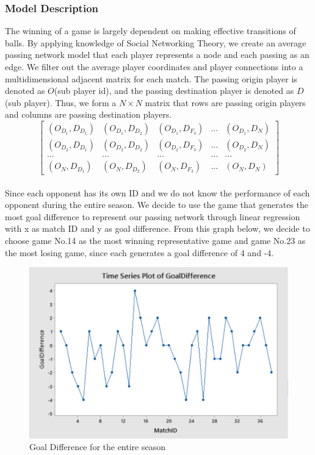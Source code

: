 \documentclass[12pt]{article}
\begin{document}
\subsubsection{Model Description}
The winning of a game is largely dependent on making effective transitions of balls. By applying knowledge of Social Networking Theory, we create an average passing network model that each player represents a node and each passing as an edge. We filter out the average player coordinates and player connections into a multidimensional adjacent matrix for each match. The passing origin player is denoted as $O$(sub player id), and the passing destination player is denoted as $D$(sub player). Thus, we form a $N \times N$ matrix that rows are passing origin players and columns are passing destination players. \\
\begin{equation*}
\begin{bmatrix}
(O_{D_1},D_{D_1}) & (O_{D_1},D_{D_2}) & (O_{D_1},D_{F_3}) &
...&
(O_{D_1},D_{N})\\
(O_{D_2},D_{D_1}) & (O_{D_2},D_{D_2}) & (O_{D_2},D_{F_3}) &
...&
(O_{D_2},D_{N})\\
... & ... & ...& ...& ...\\
(O_{N},D_{D_1}) & (O_{N},D_{D_2}) & (O_{N},D_{F_3}) &
...&
(O_{N},D_{N})
\end{bmatrix}
\end{equation*}\\
Since each opponent has its own ID and we do not know the performance of each opponent during the entire season. We decide to use the game that generates the most goal difference to represent our passing network through linear regression with x as match ID and y as goal difference. From this graph below, we decide to choose game No.14 as the most winning representative game and game No.23 as the most losing game, since each generates a goal difference of 4 and -4.\\
\begin{figure}[ht]
\begin{center}
\includegraphics[scale=0.5]{images/GoalDifference.png}
\caption{Goal Difference for the entire season}
\end{center}
\end{figure}\\
\end{document}
